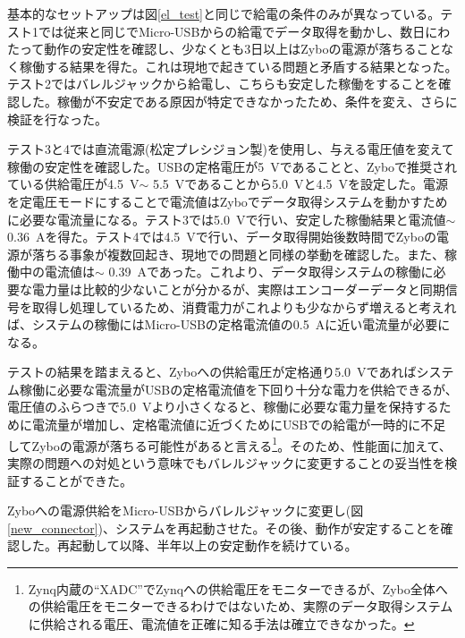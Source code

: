 基本的なセットアップは図\ref{el_test}と同じで給電の条件のみが異なっている。テスト1では従来と同じでMicro-USBからの給電でデータ取得を動かし、数日にわたって動作の安定性を確認し、少なくとも3日以上はZyboの電源が落ちることなく稼働する結果を得た。これは現地で起きている問題と矛盾する結果となった。テスト2ではバレルジャックから給電し、こちらも安定した稼働をすることを確認した。稼働が不安定である原因が特定できなかったため、条件を変え、さらに検証を行なった。

テスト3と4では直流電源(松定プレシジョン製)を使用し、与える電圧値を変えて稼働の安定性を確認した。USBの定格電圧が\SI{5}{V}であることと、Zyboで推奨されている供給電圧が\SI{4.5}{V}$\sim$ \SI{5.5}{V}であることから\SI{5.0}{V}と\SI{4.5}{V}を設定した。電源を定電圧モードにすることで電流値はZyboでデータ取得システムを動かすために必要な電流量になる。テスト3では\SI{5.0}{V}で行い、安定した稼働結果と電流値$\sim$ \SI{0.36}{A}を得た。テスト4では\SI{4.5}{V}で行い、データ取得開始後数時間でZyboの電源が落ちる事象が複数回起き、現地での問題と同様の挙動を確認した。また、稼働中の電流値は$\sim$ \SI{0.39}{A}であった。これより、データ取得システムの稼働に必要な電力量は比較的少ないことが分かるが、実際はエンコーダーデータと同期信号を取得し処理しているため、消費電力がこれよりも少なからず増えると考えれば、システムの稼働にはMicro-USBの定格電流値の\SI{0.5}{A}に近い電流量が必要になる。

テストの結果を踏まえると、Zyboへの供給電圧が定格通り\SI{5.0}{V}であればシステム稼働に必要な電流量がUSBの定格電流値を下回り十分な電力を供給できるが、電圧値のふらつきで\SI{5.0}{V}より小さくなると、稼働に必要な電力量を保持するために電流量が増加し、定格電流値に近づくためにUSBでの給電が一時的に不足してZyboの電源が落ちる可能性があると言える\footnote{Zynq内蔵の``XADC''でZynqへの供給電圧をモニターできるが、Zybo全体への供給電圧をモニターできるわけではないため、実際のデータ取得システムに供給される電圧、電流値を正確に知る手法は確立できなかった。}。そのため、性能面に加えて、実際の問題への対処という意味でもバレルジャックに変更することの妥当性を検証することができた。

Zyboへの電源供給をMicro-USBからバレルジャックに変更し(図\ref{new_connector})、システムを再起動させた。その後、動作が安定することを確認した。再起動して以降、半年以上の安定動作を続けている。

